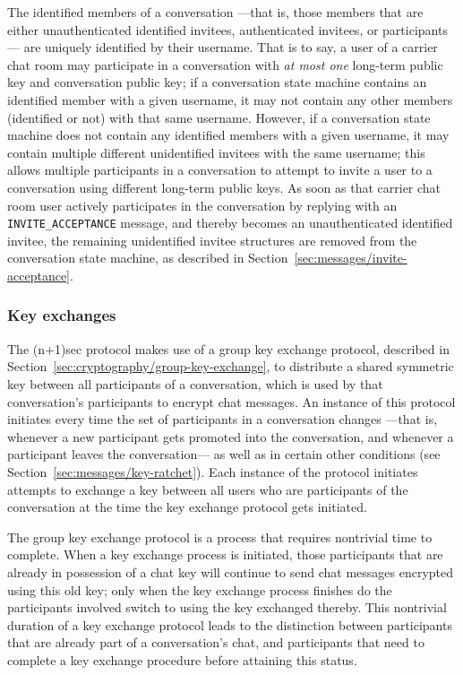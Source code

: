 \documentclass{article}
\def\message#1{\texttt{#1}}
\begin{document}
The identified members of a conversation ---that is, those members that are either unauthenticated identified invitees, authenticated invitees, or participants--- are uniquely identified by their username.
That is to say, a user of a carrier chat room may participate in a conversation with \emph{at most one} long-term public key and conversation public key; if a conversation state machine contains an identified member with a given username, it may not contain any other members (identified or not) with that same username.
However, if a conversation state machine does not contain any identified members with a given username, it may contain multiple different unidentified invitees with the same username; this allows multiple participants in a conversation to attempt to invite a user to a conversation using different long-term public keys.
As soon as that carrier chat room user actively participates in the conversation by replying with an \message{INVITE\_ACCEPTANCE} message, and thereby becomes an unauthenticated identified invitee, the remaining unidentified invitee structures are removed from the conversation state machine, as described in Section~\ref{sec:messages/invite-acceptance}.


\subsubsection{Key exchanges}
\label{sec:conversation-state-machine/contents/key-exchanges}

The (n+1)sec protocol makes use of a group key exchange protocol, described in Section~\ref{sec:cryptography/group-key-exchange}, to distribute a shared symmetric key between all participants of a conversation, which is used by that conversation's participants to encrypt chat messages.
An instance of this protocol initiates every time the set of participants in a conversation changes ---that is, whenever a new participant gets promoted into the conversation, and whenever a participant leaves the conversation--- as well as in certain other conditions (see Section~\ref{sec:messages/key-ratchet}).
Each instance of the protocol initiates attempts to exchange a key between all users who are participants of the conversation at the time the key exchange protocol gets initiated.

The group key exchange protocol is a process that requires nontrivial time to complete.
When a key exchange process is initiated, those participants that are already in possession of a chat key will continue to send chat messages encrypted using this old key; only when the key exchange process finishes do the participants involved switch to using the key exchanged thereby.
This nontrivial duration of a key exchange protocol leads to the distinction between participants that are already part of a conversation's chat, and participants that need to complete a key exchange procedure before attaining this status.
\end{document}

